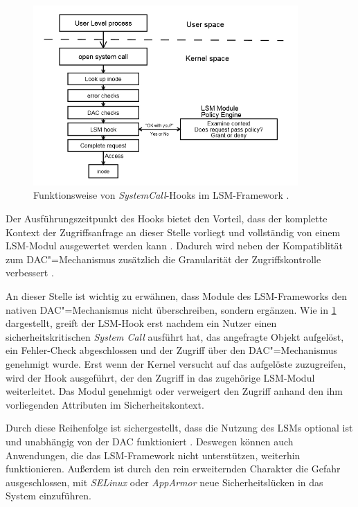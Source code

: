 \documentclass[../main.tex]{subfiles}
\begin{document}
			\begin{figure}[h]
					\centering
					\includegraphics[width=0.9\textwidth]{./images/sec_LSMHook.jpg}
					\caption{Funktionsweise von \emph{\gls{SystemCall}}-Hooks im LSM-Framework \cite[S.3]{LSMFramework}.}
					\label{fig:sec_LSMHook}
			\end{figure}

			Der Ausführungszeitpunkt des Hooks bietet den Vorteil, dass der komplette Kontext der Zugriffsanfrage an dieser Stelle vorliegt und vollständig von einem LSM-Modul ausgewertet werden kann \cite[S.2]{LSMFramework}. Dadurch wird neben der Kompatiblität zum DAC"=Mechanismus zusätzlich die Granularität der Zugriffskontrolle verbessert \cite{LSMDesign}.

			An dieser Stelle ist wichtig zu erwähnen, dass Module des LSM-Frameworks den nativen DAC"=Mechanismus nicht überschreiben, sondern ergänzen. Wie in \fig \ref{fig:sec_LSMHook} dargestellt, greift der LSM-Hook erst nachdem ein Nutzer einen sicherheitskritischen \emph{System Call} ausführt hat, das angefragte Objekt aufgelöst, ein Fehler-Check abgeschlossen und der Zugriff über den DAC"=Mechanismus genehmigt wurde. Erst wenn der Kernel versucht auf das aufgelöste  zuzugreifen, wird der Hook ausgeführt, der den Zugriff in das zugehörige LSM-Modul weiterleitet. Das Modul genehmigt oder verweigert den Zugriff anhand den ihm vorliegenden Attributen im Sicherheitskontext.

			Durch diese Reihenfolge ist sichergestellt, dass die Nutzung des LSMs optional ist und unabhängig von der DAC funktioniert \cite{centOsMCS}. Deswegen können auch Anwendungen, die das LSM-Framework nicht unterstützen, weiterhin funktionieren. Außerdem ist durch den rein erweiternden Charakter die Gefahr ausgeschlossen, mit \emph{SELinux} oder \emph{AppArmor} neue Sicherheitslücken in das System einzuführen.
\end{document}
